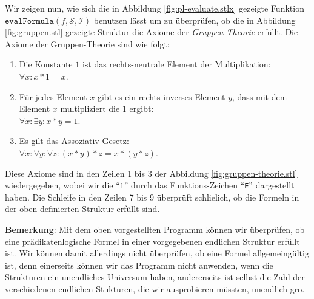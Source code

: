 Wir zeigen nun, wie sich die in Abbildung \ref{fig:pl-evaluate.stlx} gezeigte Funktion
$\texttt{evalFormula}(f, \mathcal{S}, \mathcal{I})$ benutzen l\"{a}sst um zu \"{u}berpr\"{u}fen, ob die
in Abbildung \ref{fig:gruppen.stl} gezeigte Struktur die Axiome der \emph{Gruppen-Theorie}
erf\"{u}llt.  Die Axiome der Gruppen-Theorie sind wie folgt:
\begin{enumerate}
\item Die Konstante $1$ ist das rechts-neutrale Element der Multiplikation:
      \\[0.2cm]
      \hspace*{1.3cm}
      $\forall x\colon x * 1 = x$.
\item F\"{u}r jedes Element $x$ gibt es ein rechts-inverses Element $y$, dass mit
      dem Element $x$ multipliziert die $1$ ergibt:      
      \\[0.2cm]
      \hspace*{1.3cm}
      $\forall x \colon \exists y \colon x * y = 1$.
\item Es gilt das Assoziativ-Gesetz:
      \\[0.2cm]
      \hspace*{1.3cm}
      $\forall x \colon \forall y \colon \forall z \colon (x * y) * z = x * (y * z)$.
\end{enumerate}
Diese Axiome sind in den Zeilen 1 bis 3 der Abbildung \ref{fig:gruppen-theorie.stl}
wiedergegeben, wobei wir die ``$1$'' durch das Funktions-Zeichen ``\texttt{E}'' dargestellt haben.
Die Schleife in den Zeilen 7 bis 9 \"{u}berpr\"{u}ft schlie\3lich, ob die Formeln in der oben
definierten Struktur erf\"{u}llt sind.
\vspace*{0.3cm}
\pagebreak

\noindent
\textbf{Bemerkung}:  Mit dem oben vorgestellten Programm k\"{o}nnen wir \"{u}berpr\"{u}fen, ob eine
pr\"{a}dikatenlogische Formel in einer vorgegebenen endlichen Struktur erf\"{u}llt ist. Wir k\"{o}nnen damit
allerdings nicht \"{u}berpr\"{u}fen, ob eine Formel allgemeing\"{u}ltig ist, denn einerseits k\"{o}nnen
wir das Programm nicht anwenden, wenn die Strukturen ein unendliches Universum haben,
andererseits ist selbst die Zahl der verschiedenen endlichen Stukturen, die wir ausprobieren
m\"{u}ssten, unendlich gro\3.

